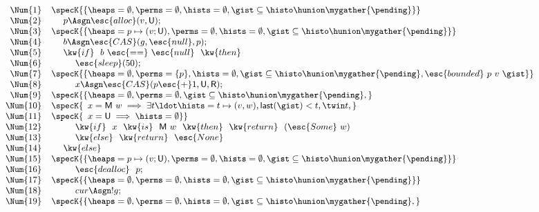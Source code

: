 {
\begin{figure}
\centering
\[
{\small{
\begin{array}{rl}
 \Num{1} & \specK{\{\heaps = \emptyset, \perms = \emptyset, \hists = \emptyset, \gist \subseteq \histo \hunion \mygather{\pending} \}}
\\ 
 \Num{2} & ~~~~ p \Asgn \esc{alloc}(v, \Unmatched);\\
 \Num{3} & \specK{\{\heaps = p \mapsto (v; \Unmatched), \perms = \emptyset, \hists = \emptyset, \gist \subseteq \histo \hunion \mygather{\pending} \}}\\
 \Num{4} & ~~~~ b \Asgn \esc{CAS}(g, \esc{null}, p);\\
 \Num{5} & ~~~~ \kw{if}~~b~\esc{==}~\esc{null}~~\kw{then}\\
 \Num{6} & ~~~~ ~~~~ \esc{sleep}(50);\\
 \Num{7} & \specK{\{\heaps = \emptyset, \perms = \{p\}, \hists = \emptyset, \gist \subseteq \histo \hunion \mygather{\pending}, \esc{bounded}\ p\ v\ \gist \}}\\
 \Num{8} & ~~~~ ~~~~ x \Asgn \esc{CAS}(p\esc{+}1, \Unmatched, \Retired);\\
 \Num{9} & \specK{\{\heaps = \emptyset, \perms = \emptyset, \gist \subseteq \histo \hunion \mygather{\pending},\hbox{}} \\
\Num{10} & \specK{\hphantom{\}}x = \Matched w \implies \exists t\ldot \hists = t \mapsto (v, w), \mathsf{last}(\gist) < t, \twin t,}\\
\Num{11} & \specK{\hphantom{\}}x = \Unmatched \implies \hists = \emptyset \}}\\
\Num{12} & ~~~~ ~~~~ \kw{if}~~x~~\kw{is}~~\Matched w~~\kw{then}~~\kw{return}~~(\esc{Some}~w)\\
\Num{13} & ~~~~ ~~~~ \kw{else}~~\kw{return}~~\esc{None}\\
\Num{14} & ~~~~ \kw{else}\\
\Num{15} & \specK{\{\heaps = p \mapsto (v; \Unmatched), \perms = \emptyset, \hists = \emptyset, \gist \subseteq \histo \hunion \mygather{\pending}\}}\\
\Num{16} & ~~~~ ~~~~ \esc{dealloc}~~p;\\
\Num{17} & \specK{\{\heaps = \emptyset, \perms = \emptyset, \hists = \emptyset, \gist \subseteq \histo \hunion \mygather{\pending}\}}\\
\Num{18} & ~~~~ ~~~~ cur \Asgn !g;\\
\Num{19} & \specK{\{\heaps = \emptyset, \perms = \emptyset, \hists = \emptyset, \gist \subseteq \histo \hunion \mygather{\pending},}\\

\end{array}}}\]
\end{figure}}
